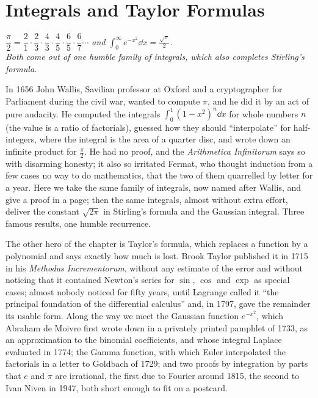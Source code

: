 \chapter{Integrals and Taylor Formulas}

\begin{center}\itshape
$\dfrac\pi2=\dfrac21\cdot\dfrac23\cdot\dfrac43\cdot\dfrac45\cdot\dfrac65\cdot\dfrac67\cdots$ \quad and \quad $\displaystyle\int_0^\infty e^{-x^2}\dd x=\frac{\sqrt\pi}2$.\\
Both come out of one humble family of integrals, which also completes Stirling's formula.
\end{center}

In 1656 John Wallis, Savilian professor at Oxford and a cryptographer for Parliament during the civil war, wanted to compute $\pi$, and he did it
by an act of pure audacity. He computed the integrals $\int_0^1(1-x^2)^{n}\dd x$ for whole numbers $n$ (the value is a ratio of factorials), guessed
how they should ``interpolate'' for half-integers, where the integral is the area of a quarter disc, and wrote down an infinite product for
$\frac\pi2$. He had no proof, and the \emph{Arithmetica Infinitorum} says so with disarming honesty; it also so irritated Fermat, who thought
induction from a few cases no way to do mathematics, that the two of them quarrelled by letter for a year. Here we take the same family of integrals,
now named after Wallis, and give a proof in a page; then the same integrals, almost without extra effort, deliver the constant $\sqrt{2\pi}$ in
Stirling's formula and the Gaussian integral. Three famous results, one humble recurrence.

The other hero of the chapter is Taylor's formula, which replaces a function by a polynomial and says exactly how much is lost. Brook Taylor
published it in 1715 in his \emph{Methodus Incrementorum}, without any estimate of the error and without noticing that it contained Newton's series
for $\sin$, $\cos$ and $\exp$ as special cases; almost nobody noticed for fifty years, until Lagrange called it ``the principal foundation of the
differential calculus'' and, in 1797, gave the remainder its usable form. Along the way we meet the Gaussian function $e^{-x^2}$, which Abraham de Moivre
first wrote down in a privately printed pamphlet of 1733, as an approximation to the binomial coefficients, and whose integral Laplace evaluated in 1774;
the Gamma function, with which Euler interpolated the factorials in a letter to Goldbach of 1729; and two proofs by integration by parts that $e$ and $\pi$ are
irrational, the first due to Fourier around 1815, the second to Ivan Niven in 1947, both short enough to fit on a postcard.


